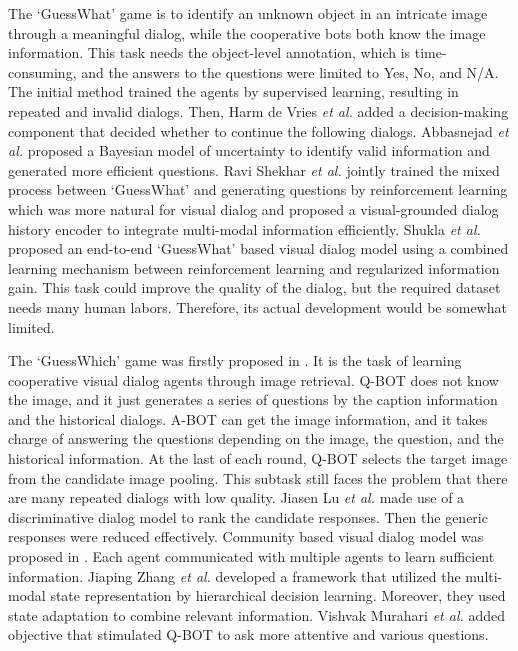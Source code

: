 \documentclass[review]{elsarticle}
\begin{document}
	The `GuessWhat' game is to identify an unknown object in an intricate image through a meaningful dialog, while the cooperative bots both know the image information. This task needs the object-level annotation, which is time-consuming, and the answers to the questions were limited to Yes, No, and N/A.
	The initial method \cite{DBLP:conf/cvpr/VriesSCPLC17} trained the agents by supervised learning, resulting in repeated and invalid dialogs. Then, Harm de Vries \textit{et al.} \cite{DBLP:conf/cvpr/VriesSCPLC17} added a decision-making component that decided whether to continue the following dialogs. 
	Abbasnejad \textit{et al.} \cite{abbasnejad2019s} proposed a Bayesian model of uncertainty to identify valid information and generated more efficient questions.
	Ravi Shekhar \textit{et al.} \cite{DBLP:conf/naacl/ShekharVBBPBF19} jointly trained the mixed process between `GuessWhat' and generating questions by reinforcement learning which was more natural for visual dialog and proposed a visual-grounded dialog history encoder to integrate multi-modal information efficiently. 
	Shukla \textit{et al.} \cite{shukla2019should} proposed an end-to-end `GuessWhat' based visual dialog model using a combined learning mechanism between reinforcement learning and regularized information gain. 
	This task could improve the quality of the dialog, but the required dataset needs many human labors. Therefore, its actual development would be somewhat limited. 
	
	The `GuessWhich' game was firstly proposed in \cite{DBLP:conf/iccv/DasKMLB17}. It is the task of learning cooperative visual dialog agents through image retrieval. Q-BOT does not know the image, and it just generates a series of questions by the caption information and the historical dialogs. A-BOT can get the image information, and it takes charge of answering the questions depending on the image, the question, and the historical information. 
	At the last of each round, Q-BOT selects the target image from the candidate image pooling. This subtask still faces the problem that there are many repeated dialogs with low quality. 
	Jiasen Lu \textit{et al.} \cite{DBLP:conf/nips/LuKYPB17} made use of a discriminative dialog model to rank the candidate responses. Then the generic responses were reduced effectively. 
	Community based visual dialog model was proposed in \cite{DBLP:conf/atal/AgarwalGSLS19}. Each agent communicated with multiple agents to learn sufficient information. 
	Jiaping Zhang \textit{et al.} \cite{DBLP:conf/sigdial/ZhangZY18} developed a framework that utilized the multi-modal state representation by hierarchical decision learning. Moreover, they used state adaptation to combine relevant information. 
	Vishvak Murahari \textit{et al.} \cite{DBLP:conf/emnlp/MurahariCBPD19} added objective that stimulated Q-BOT to ask more attentive and various questions.
	
\end{document}
